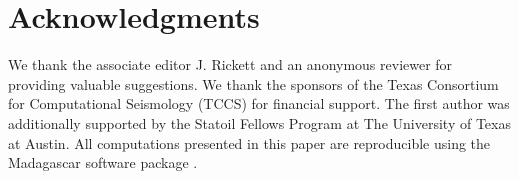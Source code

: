 \section{Acknowledgments}
We thank the associate editor J. Rickett and an anonymous reviewer for providing valuable suggestions.
We thank the sponsors of the Texas Consortium for Computational Seismology (TCCS) for financial support.
The first author was additionally supported by the Statoil Fellows Program at The University of Texas at Austin.
All computations presented in this paper are reproducible using the Madagascar software package \cite[]{fomel13}.



